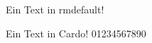 \documentclass{article}
\begin{document}
\Huge

Ein Text in rmdefault!

{\sffamily
Ein Text in Cardo!  01234567890}
\end{document}
